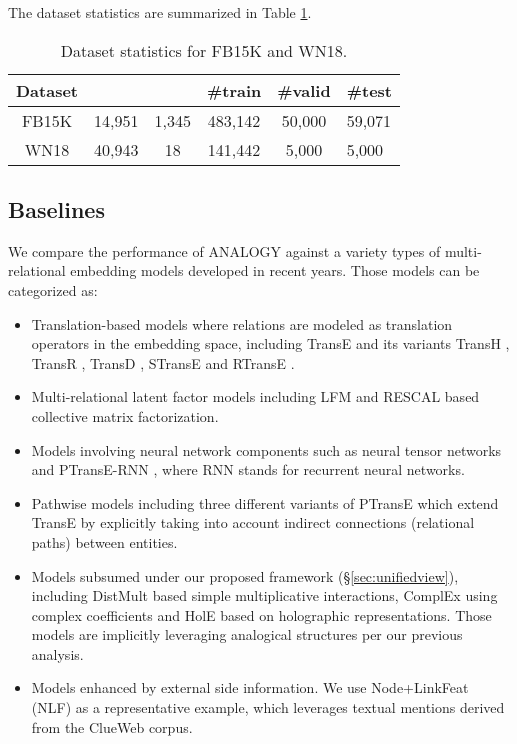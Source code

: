 \documentclass{article}
\begin{document}
The dataset statistics are summarized in Table \ref{tab:datasets}.

\begin{table}[h]
    \centering
    \begin{tabularx}{\linewidth}{cccccX}
        \toprule
        Dataset &  &  & \#train & \#valid & \#test \\
        \midrule
        FB15K & 14,951 & 1,345 & 483,142 & 50,000 & 59,071 \\
        WN18 & 40,943 & 18 & 141,442 & 5,000 & 5,000 \\
        \bottomrule
    \end{tabularx}
    \caption{Dataset statistics for FB15K and WN18.}
    \label{tab:datasets}
\end{table}

\subsection{Baselines}
\label{sec:baselines}
We compare the performance of ANALOGY against a variety types of multi-relational embedding models
developed in recent years. Those models can be categorized as: 
\begin{itemize}
    \item Translation-based models
        where relations are modeled as translation operators in the embedding space,
        including TransE \cite{bordes2013translating} and its variants TransH \cite{wang2014knowledge}, TransR \cite{lin2015learning}, TransD \cite{ji2015knowledge},
        STransE \cite{nguyen2016stranse} and RTransE \cite{garcia2015composing}.
    \item Multi-relational latent factor models including LFM \cite{jenatton2012latent}
        and RESCAL \cite{nickel2011three} based collective matrix factorization.
    \item Models involving neural network components such as neural tensor networks \cite{socher2013reasoning} and PTransE-RNN \cite{lin2015learning},
        where RNN stands for recurrent neural networks.
    \item Pathwise models including three different variants of PTransE \cite{lin2015modeling} which extend TransE by explicitly taking into account
        indirect connections (relational paths) between entities.
    \item Models subsumed under our proposed framework (\S \ref{sec:unifiedview}),
        including DistMult \cite{DBLP:journals/corr/YangYHGD14a} based simple multiplicative interactions, ComplEx \cite{DBLP:conf/icml/TrouillonWRGB16} using complex coefficients
        and HolE \cite{DBLP:conf/aaai/NickelRP16} based on holographic representations.
        Those models are implicitly leveraging analogical structures per our previous analysis.
    \item Models enhanced by external side information.
        We use Node+LinkFeat (NLF) \cite{toutanova2015observed} as a representative example,
        which leverages textual mentions derived from the ClueWeb corpus.
\end{itemize}
\end{document}
